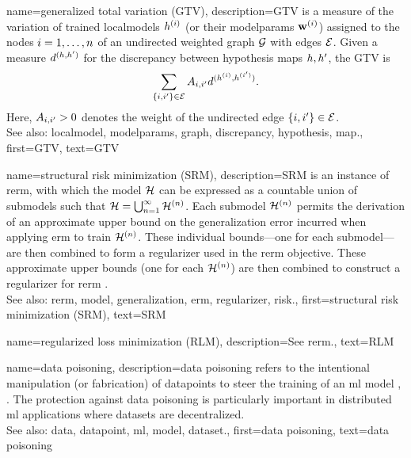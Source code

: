 	
{name={generalized total variation (GTV)}, 
	description={GTV is a 
		measure of the variation of trained \glspl{localmodel} $h^{(i)}$ 
		(or their \gls{modelparams} $\mathbf{w}^{(i)}$) assigned to the nodes $i=1,\ldots,n$ 
		of an undirected weighted \gls{graph} $\mathcal{G}$ with edges $\mathcal{E}$. Given a measure $d^{(h,h')}$ 
		for the \gls{discrepancy} between \gls{hypothesis} \glspl{map} $h,h'$, the GTV is 
		\begin{equation} 
			\nonumber
			\sum_{\{i,i'\}\in \mathcal{E}} A_{i,i'} 
			d^{(h^{(i)},h^{(i')})}.
		\end{equation}
		Here, $A_{i,i'}>0$ denotes the weight of the undirected edge $\{i,i'\}\in \mathcal{E}$.
				\\
		See also: \gls{localmodel}, \gls{modelparams}, \gls{graph}, \gls{discrepancy}, \gls{hypothesis}, \gls{map}.},
	first={GTV},
	text={GTV} 
}
	
{name={structural risk minimization (SRM)}, 
	description={SRM is an
		instance of \gls{rerm}, with which the \gls{model} $\mathcal{H}$ can be expressed 
		as a countable union of submodels such that $\mathcal{H} = \bigcup_{n=1}^{\infty} \mathcal{H}^{(n)}$. 
		Each submodel $\mathcal{H}^{(n)}$ permits the derivation of an approximate upper bound 
		on the \gls{generalization} error incurred when applying \gls{erm} to train $\mathcal{H}^{(n)}$. 
		These individual bounds—one for each submodel—are then combined to form a \gls{regularizer} 
		used in the \gls{rerm} objective. 
        		These approximate upper bounds (one for each $\mathcal{H}^{(n)}$) are then combined 
		to construct a \gls{regularizer} for \gls{rerm} \cite[Sec.\ 7.2]{ShalevMLBook}.
				\\
		See also: \gls{rerm}, \gls{model}, \gls{generalization}, \gls{erm}, \gls{regularizer}, \gls{risk}.},
	first={structural risk minimization (SRM)},
	text={SRM}
 }

 {name={regularized loss minimization (RLM)},
 	description={See \gls{rerm}.},
 	text={RLM}
 }
 

{name={data poisoning}, 
	description={\Gls{data} 
		poisoning refers to the intentional manipulation (or fabrication) of \glspl{datapoint} to 
		steer the training of an \gls{ml} \gls{model} \cite{Liu2021}, \cite{PoisonGAN}. The protection against 
		\gls{data} poisoning is particularly important in distributed \gls{ml} applications where \glspl{dataset} are decentralized.
				\\
		See also: \gls{data}, \gls{datapoint}, \gls{ml}, \gls{model}, \gls{dataset}.},
	first={data poisoning},
	text={data poisoning} 
}
	
